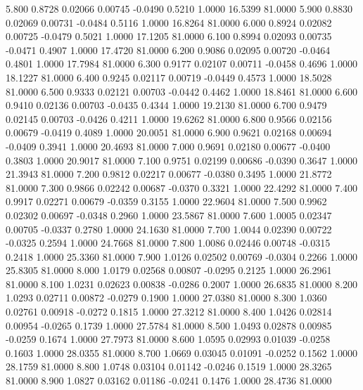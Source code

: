    5.800   0.8728   0.02066   0.00745  -0.0490   0.5210   1.0000  16.5399  81.0000
   5.900   0.8830   0.02069   0.00731  -0.0484   0.5116   1.0000  16.8264  81.0000
   6.000   0.8924   0.02082   0.00725  -0.0479   0.5021   1.0000  17.1205  81.0000
   6.100   0.8994   0.02093   0.00735  -0.0471   0.4907   1.0000  17.4720  81.0000
   6.200   0.9086   0.02095   0.00720  -0.0464   0.4801   1.0000  17.7984  81.0000
   6.300   0.9177   0.02107   0.00711  -0.0458   0.4696   1.0000  18.1227  81.0000
   6.400   0.9245   0.02117   0.00719  -0.0449   0.4573   1.0000  18.5028  81.0000
   6.500   0.9333   0.02121   0.00703  -0.0442   0.4462   1.0000  18.8461  81.0000
   6.600   0.9410   0.02136   0.00703  -0.0435   0.4344   1.0000  19.2130  81.0000
   6.700   0.9479   0.02145   0.00703  -0.0426   0.4211   1.0000  19.6262  81.0000
   6.800   0.9566   0.02156   0.00679  -0.0419   0.4089   1.0000  20.0051  81.0000
   6.900   0.9621   0.02168   0.00694  -0.0409   0.3941   1.0000  20.4693  81.0000
   7.000   0.9691   0.02180   0.00677  -0.0400   0.3803   1.0000  20.9017  81.0000
   7.100   0.9751   0.02199   0.00686  -0.0390   0.3647   1.0000  21.3943  81.0000
   7.200   0.9812   0.02217   0.00677  -0.0380   0.3495   1.0000  21.8772  81.0000
   7.300   0.9866   0.02242   0.00687  -0.0370   0.3321   1.0000  22.4292  81.0000
   7.400   0.9917   0.02271   0.00679  -0.0359   0.3155   1.0000  22.9604  81.0000
   7.500   0.9962   0.02302   0.00697  -0.0348   0.2960   1.0000  23.5867  81.0000
   7.600   1.0005   0.02347   0.00705  -0.0337   0.2780   1.0000  24.1630  81.0000
   7.700   1.0044   0.02390   0.00722  -0.0325   0.2594   1.0000  24.7668  81.0000
   7.800   1.0086   0.02446   0.00748  -0.0315   0.2418   1.0000  25.3360  81.0000
   7.900   1.0126   0.02502   0.00769  -0.0304   0.2266   1.0000  25.8305  81.0000
   8.000   1.0179   0.02568   0.00807  -0.0295   0.2125   1.0000  26.2961  81.0000
   8.100   1.0231   0.02623   0.00838  -0.0286   0.2007   1.0000  26.6835  81.0000
   8.200   1.0293   0.02711   0.00872  -0.0279   0.1900   1.0000  27.0380  81.0000
   8.300   1.0360   0.02761   0.00918  -0.0272   0.1815   1.0000  27.3212  81.0000
   8.400   1.0426   0.02814   0.00954  -0.0265   0.1739   1.0000  27.5784  81.0000
   8.500   1.0493   0.02878   0.00985  -0.0259   0.1674   1.0000  27.7973  81.0000
   8.600   1.0595   0.02993   0.01039  -0.0258   0.1603   1.0000  28.0355  81.0000
   8.700   1.0669   0.03045   0.01091  -0.0252   0.1562   1.0000  28.1759  81.0000
   8.800   1.0748   0.03104   0.01142  -0.0246   0.1519   1.0000  28.3265  81.0000
   8.900   1.0827   0.03162   0.01186  -0.0241   0.1476   1.0000  28.4736  81.0000

